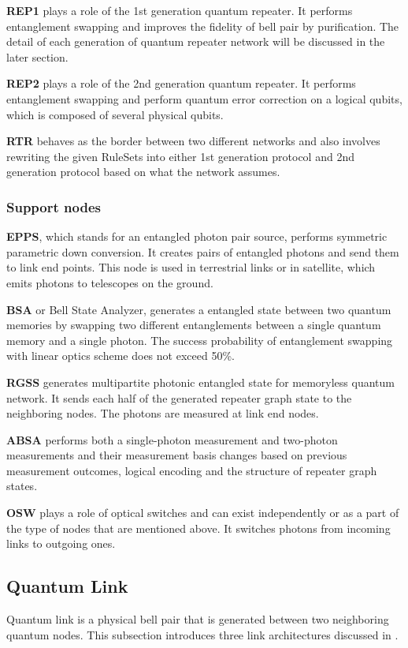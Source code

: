 \textbf{REP1} plays a role of the 1st generation quantum repeater. It performs entanglement swapping and improves the fidelity of bell pair by purification.
The detail of each generation of quantum repeater network will be discussed in the later section.

\textbf{REP2} plays a role of the 2nd generation quantum repeater. It performs entanglement swapping and perform quantum error correction on a logical qubits, which is composed of several physical qubits.

\textbf{RTR} behaves as the border between two different networks and also involves rewriting the given RuleSets into either 1st generation protocol and 2nd generation protocol based on what the network assumes.

\subsubsection{Support nodes}

\textbf{EPPS}, which stands for an entangled photon pair source, performs symmetric parametric down conversion.
It creates pairs of entangled photons and send them to link end points. This node is used in terrestrial links or in satellite, which emits photons to telescopes on the ground.

\textbf{BSA} or Bell State Analyzer, generates a entangled state between two quantum memories by swapping two different entanglements between a single quantum memory and a single photon.
The success probability of entanglement swapping with linear optics scheme does not exceed 50\%.

\textbf{RGSS} generates multipartite photonic entangled state for memoryless quantum network. It sends each half of the generated repeater graph state to the neighboring nodes.
The photons are measured at link end nodes.

\textbf{ABSA} performs both a single-photon measurement and two-photon measurements and their measurement basis changes based on previous measurement outcomes, logical encoding and the structure of repeater graph states.

\textbf{OSW} plays a role of optical switches and can exist independently or as a part of the type of nodes that are mentioned above.
It switches photons from incoming links to outgoing ones.

\subsection{Quantum Link}
Quantum link is a physical bell pair that is generated between two neighboring quantum nodes.  This subsection introduces three link architectures discussed in \cite{jones2016design}.

